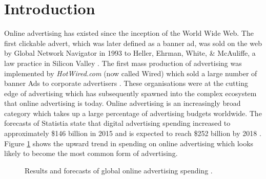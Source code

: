 \documentclass[12pt]{article}
\begin{document}
\section{Introduction}
Online advertising has existed since the inception of the World Wide Web. The first clickable advert, which was later defined as a banner ad, was sold on the web by Global Network Navigator in 1993 to Heller, Ehrman, White, \& McAuliffe, a law practice in Silicon Valley \parencite{oreilly}. The first mass production of advertising was implemented by \textit{HotWired.com} (now called Wired) which sold a large number of banner Ads to corporate advertisers \parencite{firstAd}. These organisations were at the cutting edge of advertising which has subsequently spawned into the complex ecosystem that online advertising is today. Online advertising is an increasingly broad category which takes up a large percentage of advertising budgets worldwide. The forecasts of Statistia state that digital advertising spending increased to approximately \$146 billion in 2015 and is expected to reach \$252 billion by 2018 \parencite{Statistia}. Figure \ref{fig:M1} shows the upward trend in spending on online advertising which looks likely to become the most common form of advertising.   \\

\begin{figure} [H]
    \centering
    \caption{Results and forecasts of global online advertising spending \parencite{Statistia}.} \label{fig:M1}
\end{figure}
\end{document}
